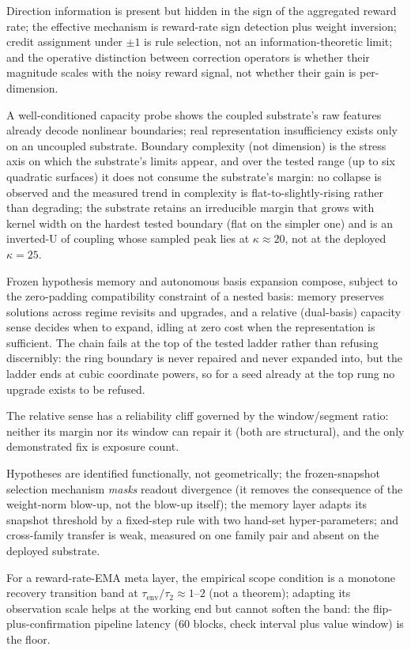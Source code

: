 \documentclass[preprint,12pt]{elsarticle}
\begin{document}
\begin{description}[leftmargin=1.6em,style=nextline]
\item[R1 (direction, rule selection, structure).] Direction information is
present but hidden in the sign of the aggregated reward rate; the effective
mechanism is reward-rate sign detection plus weight inversion; credit
assignment under $\pm1$ is rule selection, not an information-theoretic
limit; and the operative distinction between correction operators is
whether their magnitude scales with the noisy reward signal, not whether
their gain is per-dimension.
\item[R2 (representation sufficiency).] A well-conditioned capacity probe
shows the coupled substrate's raw features already decode nonlinear
boundaries; real representation insufficiency exists only on an uncoupled
substrate. Boundary complexity (not dimension) is the stress axis on which the
substrate's limits appear, and over the tested range (up to six quadratic
surfaces) it does not consume the substrate's margin: no collapse is observed
and the measured trend in complexity is flat-to-slightly-rising rather than
degrading; the substrate
retains an irreducible margin that grows with kernel width on the hardest
tested boundary (flat on the simpler one) and is an inverted-U of coupling
whose sampled peak lies at $\kappa\approx20$, not at the deployed
$\kappa=25$.
\item[R3 (the self-evolution loop).] Frozen hypothesis memory and
autonomous basis expansion compose, subject to the zero-padding compatibility
constraint of a nested basis: memory preserves
solutions across regime revisits and upgrades, and a relative (dual-basis)
capacity sense decides when to expand, idling at zero cost when the
representation is sufficient. The chain fails at the top of the tested ladder
rather than refusing discernibly: the ring boundary is never repaired and
never expanded into, but the ladder ends at cubic coordinate powers, so for a
seed already at the top rung no upgrade exists to be refused.
\item[R4 (bounds of the capacity sense).] The relative sense has a
reliability cliff governed by the window/segment ratio: neither its
margin nor its window can repair it (both are structural), and the only
demonstrated fix is exposure count.
\item[R5 (the memory layer).] Hypotheses are identified functionally, not
geometrically; the frozen-snapshot selection mechanism \emph{masks} readout
divergence (it removes the consequence of the weight-norm blow-up, not the
blow-up itself); the memory layer adapts its snapshot threshold by a
fixed-step rule with two hand-set hyper-parameters; and cross-family transfer is weak, measured on one
family pair and absent on the deployed substrate.
\item[R6 (the meta timescale).] For a reward-rate-EMA meta layer, the
empirical scope condition is a monotone recovery transition band at
$\tau_{\mathrm{env}}/\tau_2\approx1$--$2$ (not a theorem);
adapting its observation scale helps at the working end but cannot soften
the band: the flip-plus-confirmation pipeline latency ($60$ blocks, check interval plus
value window) is the floor.
\end{description}
\end{document}
